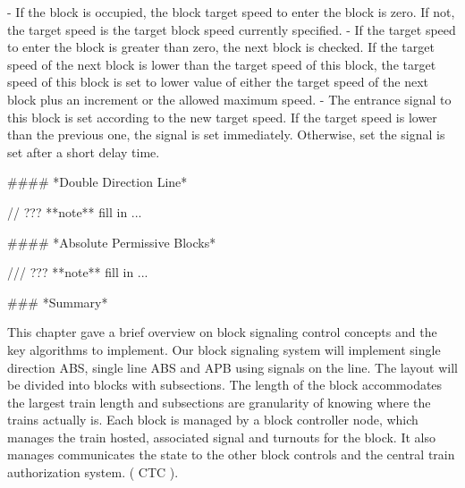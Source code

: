 - If the block is occupied, the block target speed to enter the block is zero. If not, the target speed is the target block speed currently specified.
- If the target speed to enter the block is greater than zero, the next block is checked. If the target speed of the next block is lower than the target speed of this block, the target speed of this block is set to lower value of either the target speed of the next block plus an increment or the allowed maximum speed.
- The entrance signal to this block is set according to the new target speed. If the target speed is lower than the previous one, the signal is set immediately. Otherwise, set the signal is set after a short delay time.

#### *Double Direction Line*

// ??? **note** fill in ...

#### *Absolute Permissive Blocks*

/// ??? **note** fill in ...

### *Summary*

This chapter gave a brief overview on block signaling control concepts and the key algorithms to implement. Our block signaling system will implement single direction ABS, single line ABS and APB using signals on the line. The layout will be divided into blocks with subsections. The length of the block accommodates the largest train length and subsections are granularity of knowing where the trains actually is. Each block is managed by a block controller node, which manages the train hosted, associated signal and turnouts for the block. It also manages communicates the state to the other block controls and the central train authorization system. ( CTC ).

